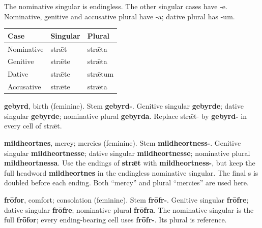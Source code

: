 The nominative singular is endingless. The other singular cases have -e. Nominative, genitive and accusative plural have -a; dative plural has -um.

\par\begingroup
\fontsize{10.5}{13.2}\selectfont
\setlength{\LTleft}{0pt}\setlength{\LTright}{\fill}
\noindent
\begin{tabular}{@{}>{\raggedright\arraybackslash}p{39.46mm}>{\raggedright\arraybackslash}p{39.46mm}>{\raggedright\arraybackslash}p{39.46mm}@{}}
\toprule
\textbf{Case} & \textbf{Singular} & \textbf{Plural} \\
\midrule
Nominative & strǣt & strǣta \\
Genitive & strǣte & strǣta \\
Dative & strǣte & strǣtum \\
Accusative & strǣte & strǣta \\
\bottomrule
\end{tabular}
\par\endgroup

\textbf{gebyrd}, birth (feminine). Stem \textbf{gebyrd-}. Genitive singular \textbf{gebyrde}; dative singular \textbf{gebyrde}; nominative plural \textbf{gebyrda}. Replace strǣt- by \textbf{gebyrd-} in every cell of strǣt.

\textbf{mildheortnes}, mercy; mercies (feminine). Stem \textbf{mildheortness-}. Genitive singular \textbf{mildheortnesse}; dative singular \textbf{mildheortnesse}; nominative plural \textbf{mildheortnessa}. Use the endings of \textbf{strǣt} with \textbf{mildheortness-}, but keep the full headword \textbf{mildheortnes} in the endingless nominative singular. The final s is doubled before each ending. Both “mercy” and plural “mercies” are used here.

\textbf{frōfor}, comfort; consolation (feminine). Stem \textbf{frōfr-}. Genitive singular \textbf{frōfre}; dative singular \textbf{frōfre}; nominative plural \textbf{frōfra}. The nominative singular is the full \textbf{frōfor}; every ending-bearing cell uses \textbf{frōfr-}. Its plural is reference.

